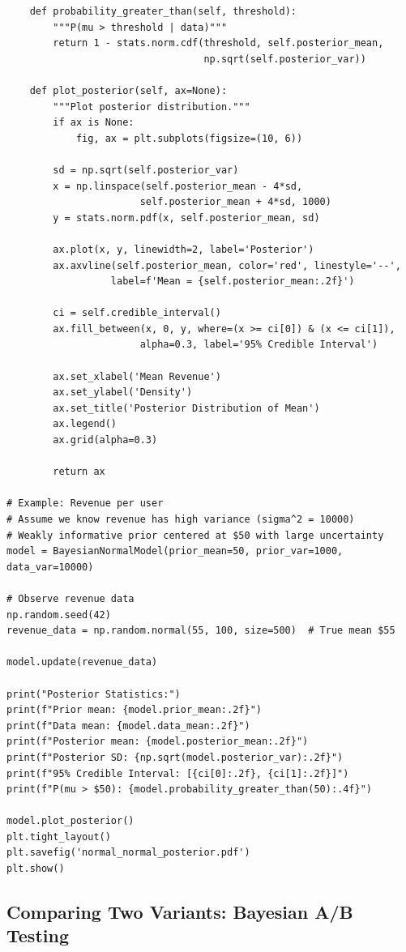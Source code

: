 \begin{lstlisting}
    def probability_greater_than(self, threshold):
        """P(mu > threshold | data)"""
        return 1 - stats.norm.cdf(threshold, self.posterior_mean,
                                  np.sqrt(self.posterior_var))

    def plot_posterior(self, ax=None):
        """Plot posterior distribution."""
        if ax is None:
            fig, ax = plt.subplots(figsize=(10, 6))

        sd = np.sqrt(self.posterior_var)
        x = np.linspace(self.posterior_mean - 4*sd,
                       self.posterior_mean + 4*sd, 1000)
        y = stats.norm.pdf(x, self.posterior_mean, sd)

        ax.plot(x, y, linewidth=2, label='Posterior')
        ax.axvline(self.posterior_mean, color='red', linestyle='--',
                  label=f'Mean = {self.posterior_mean:.2f}')

        ci = self.credible_interval()
        ax.fill_between(x, 0, y, where=(x >= ci[0]) & (x <= ci[1]),
                       alpha=0.3, label='95% Credible Interval')

        ax.set_xlabel('Mean Revenue')
        ax.set_ylabel('Density')
        ax.set_title('Posterior Distribution of Mean')
        ax.legend()
        ax.grid(alpha=0.3)

        return ax

# Example: Revenue per user
# Assume we know revenue has high variance (sigma^2 = 10000)
# Weakly informative prior centered at $50 with large uncertainty
model = BayesianNormalModel(prior_mean=50, prior_var=1000, data_var=10000)

# Observe revenue data
np.random.seed(42)
revenue_data = np.random.normal(55, 100, size=500)  # True mean $55

model.update(revenue_data)

print("Posterior Statistics:")
print(f"Prior mean: {model.prior_mean:.2f}")
print(f"Data mean: {model.data_mean:.2f}")
print(f"Posterior mean: {model.posterior_mean:.2f}")
print(f"Posterior SD: {np.sqrt(model.posterior_var):.2f}")
print(f"95% Credible Interval: [{ci[0]:.2f}, {ci[1]:.2f}]")
print(f"P(mu > $50): {model.probability_greater_than(50):.4f}")

model.plot_posterior()
plt.tight_layout()
plt.savefig('normal_normal_posterior.pdf')
plt.show()
\end{lstlisting}

\subsection{Comparing Two Variants: Bayesian A/B Testing}

